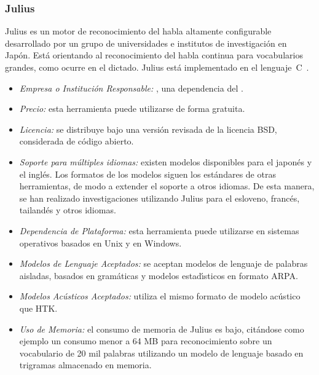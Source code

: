 \subsubsection{Julius}
\label{sec:julius}

Julius es un motor de reconocimiento del habla altamente configurable desarrollado por un grupo
de universidades e institutos de investigaci\'on en Jap\'on. Est\'a orientando al reconocimiento
del habla continua para vocabularios grandes, como ocurre en el dictado.
Julius est\'a implementado en el \mbox{lenguaje C \cite{JuliusHomePage}}.

\begin{itemize}
	\item \emph{Empresa o Instituci\'on Responsable:} ,
	una dependencia del .
	\item \emph{Precio:} esta herramienta puede utilizarse de forma gratuita.
	\item \emph{Licencia:} se distribuye bajo una versi\'on revisada de la licencia
	BSD, considerada de c\'odigo abierto.
	\item \emph{Soporte para m\'ultiples idiomas:} existen modelos disponibles para
	el japon\'es y el ingl\'es. Los formatos de los modelos siguen los est\'andares de otras
	herramientas, de modo a extender el soporte a otros idiomas. De esta manera,
	se han realizado investigaciones utilizando Julius para el esloveno, franc\'es, tailand\'es
	y otros idiomas.
	\item \emph{Dependencia de Plataforma:} esta herramienta puede utilizarse en sistemas operativos
	basados en Unix y en Windows.
	\item \emph{Modelos de Lenguaje Aceptados:} se aceptan modelos de lenguaje de palabras aisladas,
	basados en gram\'aticas y modelos estad{\'\i}sticos en formato ARPA.
	\item \emph{Modelos Ac\'usticos Aceptados:} utiliza el mismo formato de modelo ac\'ustico que HTK.
	\item \emph{Uso de Memoria:} el consumo de memoria de Julius es bajo, cit\'andose como ejemplo
	un consumo menor a 64 MB para reconocimiento sobre un vocabulario de 20 mil palabras utilizando
	un modelo de lenguaje basado en trigramas almacenado en memoria.
\end{itemize}